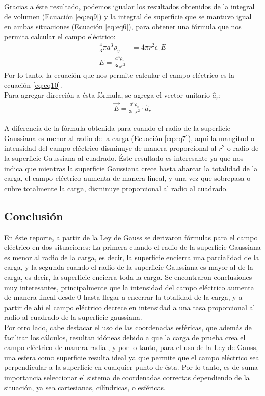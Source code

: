 \documentclass[12pt, letterpaper]{report}
\begin{document}
Gracias a éste resultado, podemos igualar los resultados obtenidos de la integral de volumen (Ecuación \ref{eq:eq9}) y la integral de superficie 
que se mantuvo igual en ambas situaciones (Ecuación \ref{eq:eq6}), para obtener una fórmula que nos permita calcular el campo eléctrico: 
\begin{align}
\frac{4}{3}\pi a^3 \rho_v &= 4\pi r^2 \epsilon_0 E \\
E = \frac{a^3\rho_v}{3\epsilon_0r^2} \label{eq:eq10}
\end{align}
Por lo tanto, la ecuación que nos permite calcular el campo eléctrico es la ecuación \ref{eq:eq10}.\\ Para agregar dirección a ésta fórmula, se agrega el vector unitario $\hat{a}_r$: 
\begin{align}
\vec{E} = \frac{a^3\rho_v}{3\epsilon_0r^2} \cdot \hat{a}_r
\end{align}

A diferencia de la fórmula obtenida para cuando el radio de la superficie 
Gaussiana es menor al radio de la carga (Ecuación \ref{eq:eq7}), aquí la mangitud o intensidad del campo eléctrico disminuye de manera proporcional al $r^2$ o radio de la superficie Gaussiana al cuadrado. Éste 
resultado es interesante ya que nos indica que mientras la superficie Gaussiana crece hasta abarcar la totalidad de la carga, el campo eléctrico aumenta de manera lineal, y una vez que sobrepasa o cubre totalmente 
la carga, disminuye proporcional al radio al cuadrado. \\

\subsection*{Conclusión}
En éste reporte, a partir de la Ley de Gauss se derivaron fórmulas para el campo eléctrico en dos situaciones: La primera cuando el radio de la superficie Gaussiana es menor al radio de la carga, es decir, la superficie 
encierra una parcialidad de la carga, y la segunda cuando el radio de la superficie Gaussiana es mayor al de la carga, es decir, la superficie encierra toda la carga. Se encontraron conclusiones muy interesantes, principalmente que la intensidad 
del campo eléctrico aumenta de manera lineal desde 0 hasta llegar a encerrar la totalidad de la carga, y a partir de ahí el campo eléctrico decrece en intensidad a una tasa 
proporcional al radio al cuadrado de la superficie gaussiana. \\

Por otro lado, cabe destacar el uso de las coordenadas esféricas, que además de facilitar los cálculos, resultan idóneas debido a que la carga de prueba crea el campo eléctrico de manera radial, y por lo tanto, 
para el uso de la Ley de Gauss, una esfera como superficie resulta ideal ya que permite que el campo eléctrico sea perpendicular a la superficie en cualquier punto de ésta. Por lo tanto, es de suma importancia seleccionar 
el sistema de coordenadas correctas dependiendo de la situación, ya sea cartesianas, cilíndricas, o esféricas. \\
\end{document}
